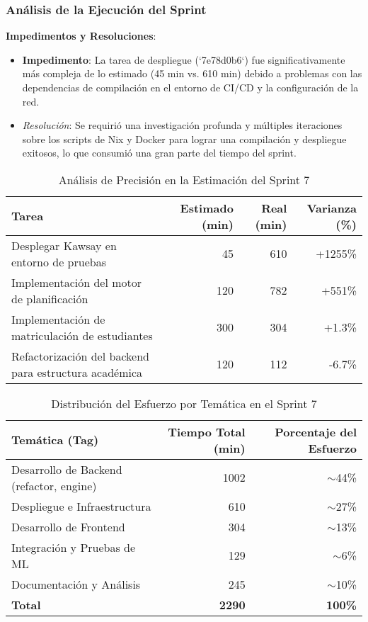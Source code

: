 \subsubsection{Análisis de la Ejecución del Sprint}

\textbf{Impedimentos y Resoluciones}:
\begin{itemize}
    \item \textbf{Impedimento}: La tarea de despliegue (`7e78d0b6`) fue significativamente más compleja de lo estimado (45 min vs. 610 min) debido a problemas con las dependencias de compilación en el entorno de CI/CD y la configuración de la red.
    \item \textit{Resolución}: Se requirió una investigación profunda y múltiples iteraciones sobre los scripts de Nix y Docker para lograr una compilación y despliegue exitosos, lo que consumió una gran parte del tiempo del sprint.
\end{itemize}

\begin{table}[H]
    \caption{Análisis de Precisión en la Estimación del Sprint 7}
    \label{tab:sprint-7-estimation-accuracy}
    \begin{tabularx}{\textwidth}{@{}Xrrr@{}}
        \toprule
        \textbf{Tarea} & \textbf{Estimado (min)} & \textbf{Real (min)} & \textbf{Varianza (\%)} \\
        \midrule
        Desplegar Kawsay en entorno de pruebas & 45 & 610 & +1255\% \\
        Implementación del motor de planificación & 120 & 782 & +551\% \\
        Implementación de matriculación de estudiantes & 300 & 304 & +1.3\% \\
        Refactorización del backend para estructura académica & 120 & 112 & -6.7\% \\
        \bottomrule
    \end{tabularx}
\end{table}

\begin{table}[H]
    \caption{Distribución del Esfuerzo por Temática en el Sprint 7}
    \label{tab:sprint-7-effort-distribution}
    \begin{tabularx}{\textwidth}{@{}Xrr@{}}
        \toprule
        \textbf{Temática (Tag)} & \textbf{Tiempo Total (min)} & \textbf{Porcentaje del Esfuerzo} \\
        \midrule
        Desarrollo de Backend (refactor, engine) & 1002 & $\sim$44\% \\
        Despliegue e Infraestructura & 610 & $\sim$27\% \\
        Desarrollo de Frontend & 304 & $\sim$13\% \\
        Integración y Pruebas de ML & 129 & $\sim$6\% \\
        Documentación y Análisis & 245 & $\sim$10\% \\
        \midrule
        \textbf{Total} & \textbf{2290} & \textbf{100\%} \\
        \bottomrule
    \end{tabularx}
\end{table}

